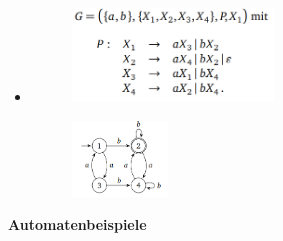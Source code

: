 \documentclass[11pt,a4paper]{article}
\begin{document}
\begin{itemize}
\begin{itemize}
	\item[]
				\begin{minipage}{0.4\textwidth}
					\begin{figure}[H]
					\includegraphics[height=2.5cm]{Bilder/reggra3}
					\end{figure}
				\end{minipage}
				\begin{minipage}[t]{0.4\textwidth}
					\vspace{-1.25cm}
					\begin{figure}[H]
					\includegraphics[height=2cm]{Bilder/reggra4}
					\end{figure}
				\end{minipage}
	\end{itemize}

\end{itemize}

\pagebreak



{\Large \textbf{Automatenbeispiele}}
\end{document}
